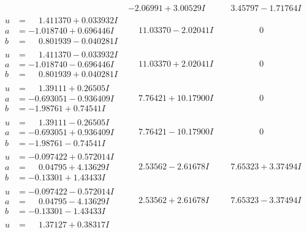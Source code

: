 \documentclass[1p]{elsarticle_modified}
\theoremstyle{definition}
\begin{document}
$$\begin{array}{c|c|c}
 & -2.06991 + 3.00529 I & \phantom{-}3.45797 - 1.71764 I \\ \hline\begin{aligned}
u &= \phantom{-}1.411370 + 0.033932 I \\
a &= -1.018740 + 0.696446 I \\
b &= \phantom{-}0.801939 - 0.040281 I\end{aligned}
 & \phantom{-}11.03370 - 2.02041 I & \phantom{-0.000000 } 0 \\ \hline\begin{aligned}
u &= \phantom{-}1.411370 - 0.033932 I \\
a &= -1.018740 - 0.696446 I \\
b &= \phantom{-}0.801939 + 0.040281 I\end{aligned}
 & \phantom{-}11.03370 + 2.02041 I & \phantom{-0.000000 } 0 \\ \hline\begin{aligned}
u &= \phantom{-}1.39111 + 0.26505 I \\
a &= -0.693051 - 0.936409 I \\
b &= -1.98761 + 0.74541 I\end{aligned}
 & \phantom{-}7.76421 + 10.17900 I & \phantom{-0.000000 } 0 \\ \hline\begin{aligned}
u &= \phantom{-}1.39111 - 0.26505 I \\
a &= -0.693051 + 0.936409 I \\
b &= -1.98761 - 0.74541 I\end{aligned}
 & \phantom{-}7.76421 - 10.17900 I & \phantom{-0.000000 } 0 \\ \hline\begin{aligned}
u &= -0.097422 + 0.572014 I \\
a &= \phantom{-}0.04795 + 4.13629 I \\
b &= -0.13301 + 1.43433 I\end{aligned}
 & \phantom{-}2.53562 - 2.61678 I & \phantom{-}7.65323 + 3.37494 I \\ \hline\begin{aligned}
u &= -0.097422 - 0.572014 I \\
a &= \phantom{-}0.04795 - 4.13629 I \\
b &= -0.13301 - 1.43433 I\end{aligned}
 & \phantom{-}2.53562 + 2.61678 I & \phantom{-}7.65323 - 3.37494 I \\ \hline\begin{aligned}
u &= \phantom{-}1.37127 + 0.38317 I \\

\end{aligned}
\end{array}$$
\end{document}
